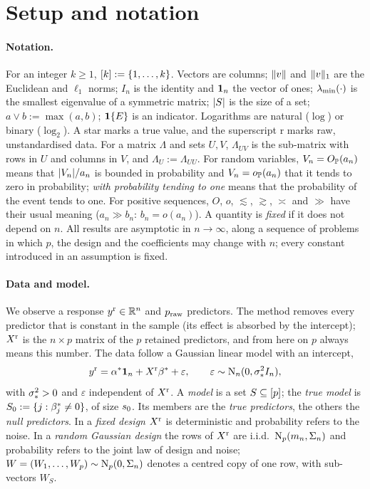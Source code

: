 \section{Setup and notation}\label{sec:setup}

\paragraph{Notation.} For an integer $k\ge1$, $[k]:=\{1,\dots,k\}$. Vectors are columns; $\lVert v\rVert$ and
$\lVert v\rVert_1$ are the Euclidean and $\ell_1$ norms; $I_n$ is the identity and $\mathbf{1}_n$ the vector of ones; $\lambda_{\min}(\cdot)$
is the smallest eigenvalue of a symmetric matrix; $\lvert S\rvert$ is the size of a set; $a\vee b:=\max(a,b)$; $\mathbf{1}\{E\}$ is an
indicator. Logarithms are natural ($\log$) or binary ($\log_2$). A star marks a true value, and the superscript
$\mathrm r$ marks raw, unstandardised data. For a matrix $\Lambda$ and sets $U,V$, $\Lambda_{UV}$ is the sub-matrix with
rows in $U$ and columns in $V$, and $\Lambda_U:=\Lambda_{UU}$. For random variables, $V_n=O_{\mathbb{P}}(a_n)$ means that
$\lvert V_n\rvert/a_n$ is bounded in probability and $V_n=o_{\mathbb{P}}(a_n)$ that it tends to zero in probability; \emph{with probability
tending to one} means that the probability of the event tends to one. For positive sequences, $O$, $o$, $\lesssim$, $\gtrsim$, $\asymp$ and $\gg$ have their usual meaning
($a_n\gg b_n$: $b_n=o(a_n)$). A quantity is
\emph{fixed} if it does not depend on $n$. All results are asymptotic in $n\to\infty$, along a sequence of problems in
which $p$, the design and the coefficients may change with $n$; every constant introduced in an assumption is fixed.

\paragraph{Data and model.} We observe a response $y^{\mathrm r}\in\mathbb{R}^n$ and $p_{\mathrm{raw}}$ predictors. The method removes every
predictor that is constant in the sample (its effect is absorbed by the intercept); $X^{\mathrm r}$ is the $n\times p$ matrix of
the $p$ retained predictors, and from here on $p$ always means this number. The data follow a Gaussian linear model with
an intercept,
\begin{equation}\label{eq:model}
  y^{\mathrm r}=\alpha^*\mathbf{1}_n+X^{\mathrm r}\beta^*+\varepsilon,\qquad \varepsilon\sim\mathrm{N}_n(0,\sigma_*^2I_n),
\end{equation}
with $\sigma_*^2>0$ and $\varepsilon$ independent of $X^{\mathrm r}$. A \emph{model} is a set $S\subseteq[p]$; the \emph{true
model} is $S_0:=\{j:\beta^*_j\neq0\}$, of size $s_0$. Its members are the \emph{true predictors}, the others the
\emph{null predictors}. In a \emph{fixed design} $X^{\mathrm r}$ is deterministic and probability refers to the noise. In a
\emph{random Gaussian design} the rows of $X^{\mathrm r}$ are i.i.d.\ $\mathrm{N}_p(m_n,\Sigma_n)$ and probability refers to the joint law
of design and noise; $W=(W_1,\dots,W_p)\sim\mathrm{N}_p(0,\Sigma_n)$ denotes a centred copy of one row, with sub-vectors $W_S$.

